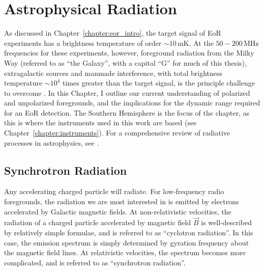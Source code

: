 \chapter{Astrophysical Radiation}
\label{chapter:astro_rad}

As discussed in Chapter~\ref{chapter:eor_intro}, the target signal of EoR experiments has a brightness temperature of order $\sim 10$\,mK. At the $50-200$\,MHz frequencies for these experiments, however, foreground radiation from the Milky Way (referred to as ``the Galaxy'', with a capital ``G'' for much of this thesis), extragalactic sources and manmade interference, with total brightness temperature $\sim 10^4$ times greater than the target signal, is the principle challenge to overcome \citep[e.g.][]{Santos.05, GSM.08, Bernardi.09, Bernardi.10, Pober.13, Dillon.14, Kohn.16, Kohn.18}. In this Chapter, I outline our current understanding of polarized and unpolarized foregrounds, and the implications for the dynamic range required for an EoR detection. The Southern Hemisphere is the focus of the chapter, as this is where the instruments used in this work are based (see Chapter~\ref{chapter:instruments}). For a comprehensive review of radiative processes in astrophysics, see \cite{Rybicki.79}. 

\section{Synchrotron Radiation}

Any accelerating charged particle will radiate. For low-frequency radio foregrounds, the radiation we are most interested in is emitted by electrons accelerated by Galactic magnetic fields.
At non-relativistic velocities, the radiation of a charged particle accelerated by magnetic field $\vec{B}$ is well-described by relatively simple formulae, and is referred to as ``cyclotron radiation''. In this case, the emission spectrum is simply determined by gyration frequency about the magnetic field lines.
At relativistic velocities, the spectrum becomes more complicated, and is referred to as ``synchrotron radiation''.


